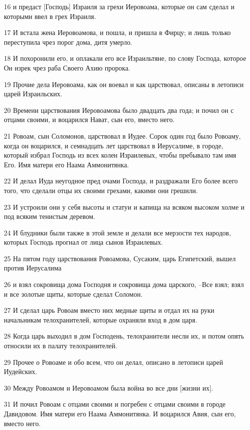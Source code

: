 \par 16 и предаст [Господь] Израиля за грехи Иеровоама, которые он сам сделал и которыми ввел в грех Израиля.
\par 17 И встала жена Иеровоамова, и пошла, и пришла в Фирцу; и лишь только переступила чрез порог дома, дитя умерло.
\par 18 И похоронили его, и оплакали его все Израильтяне, по слову Господа, которое Он изрек чрез раба Своего Ахию пророка.
\par 19 Прочие дела Иеровоама, как он воевал и как царствовал, описаны в летописи царей Израильских.
\par 20 Времени царствования Иеровоамова было двадцать два года; и почил он с отцами своими, и воцарился Нават, сын его, вместо него.
\par 21 Ровоам, сын Соломонов, царствовал в Иудее. Сорок один год было Ровоаму, когда он воцарился, и семнадцать лет царствовал в Иерусалиме, в городе, который избрал Господь из всех колен Израилевых, чтобы пребывало там имя Его. Имя матери его Наама Аммонитянка.
\par 22 И делал Иуда неугодное пред очами Господа, и раздражали Его более всего того, что сделали отцы их своими грехами, какими они грешили.
\par 23 И устроили они у себя высоты и статуи и капища на всяком высоком холме и под всяким тенистым деревом.
\par 24 И блудники были также в этой земле и делали все мерзости тех народов, которых Господь прогнал от лица сынов Израилевых.
\par 25 На пятом году царствования Ровоамова, Сусаким, царь Египетский, вышел против Иерусалима
\par 26 и взял сокровища дома Господня и сокровища дома царского, --Все взял; взял и все золотые щиты, которые сделал Соломон.
\par 27 И сделал царь Ровоам вместо них медные щиты и отдал их на руки начальникам телохранителей, которые охраняли вход в дом царя.
\par 28 Когда царь выходил в дом Господень, телохранители несли их, и потом опять относили их в палату телохранителей.
\par 29 Прочее о Ровоаме и обо всем, что он делал, описано в летописи царей Иудейских.
\par 30 Между Ровоамом и Иеровоамом была война во все дни [жизни их].
\par 31 И почил Ровоам с отцами своими и погребен с отцами своими в городе Давидовом. Имя матери его Наама Аммонитянка. И воцарился Авия, сын его, вместо него.

